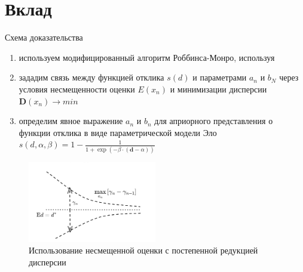 \documentclass{mipt-thesis-bs}
\begin{document}
\section{Вклад}

Схема доказательства \begin{enumerate}
    \item используем модифицированный алгоритм Роббинса-Монро, используя 
    \item зададим связь между функцией отклика $s(d)$ и параметрами $a_n$ и $b_N$ через условия несмещенности оценки $E(x_n)$ и
минимизации дисперсии $\mathbf{D}(x_n) \rightarrow min$  \cite{hu1997strong} \cite{hu1998sequential}
    \item определим явное выражение $a_n$ и $b_n$ для априорного представления о функции отклика в виде параметрической модели Эло $s(d,\alpha,\beta) = 1 - \frac{1}{1+\exp\left(-\beta \cdot(\mathbf{d} -\alpha)\right)}$
\end{enumerate}

\begin{figure}[h!]
    \centering
    \includegraphics[width=0.5\textwidth]{assets/dispersion_reduction.png}
    \caption{Использование несмещенной оценки с постепенной редукцией дисперсии}
    \label{principal_scheme}
\end{figure}
\end{document}
